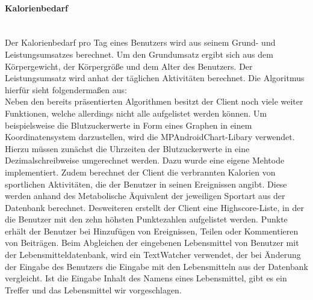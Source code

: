 	\paragraph{Kalorienbedarf}$~$ \\
	Der Kalorienbedarf pro Tag eines Benutzers wird aus seinem Grund- und Leistungsumsatzes berechnet. Um den Grundumsatz ergibt sich aus dem Körpergewicht, der Körpergröße und dem Alter des Benutzers. Der Leistungsumsatz wird anhat der täglichen Aktivitäten berechnet. Die Algoritmus hierfür sieht folgendermaßen aus:
	$~$ \\
	Neben den bereits präsentierten Algorithmen besitzt der Client noch viele weiter Funktionen, welche allerdings nicht alle aufgelistet werden können. Um beispielsweise die Blutzuckerwerte in Form eines Graphen in einem Koordinatensystem darzustellen, wird die MPAndroidChart-Libary verwendet. Hierzu müssen zunächst die Uhrzeiten der Blutzuckerwerte in eine Dezimalschreibweise umgerechnet werden. Dazu wurde eine eigene Mehtode implementiert.\newline
	Zudem berechnet der Client die verbrannten Kalorien von sportlichen Aktivitäten, die der Benutzer in seinen Ereignissen angibt. Diese werden anhand des Metabolische Äquivalent der jeweiligen Sportart aus der Datenbank berechnet. \newline
	Desweiteren erstellt der Client eine Highscore-Liste, in der die Benutzer mit den zehn höhsten Punktezahlen aufgelistet werden. Punkte erhält der Benutzer bei Hinzufügen von Ereignissen, Teilen oder Kommentieren von Beiträgen. \newline 
	Beim Abgleichen der eingebenen Lebensmittel von Benutzer mit der Lebensmitteldatenbank, wird ein TextWatcher verwendet, der bei Änderung der Eingabe des Benutzers die Eingabe mit den Lebensmitteln aus der Datenbank vergleicht. Ist die Eingabe Inhalt des Namens eines Lebensmittel, gibt es ein Treffer und das Lebensmittel wir vorgeschlagen.
